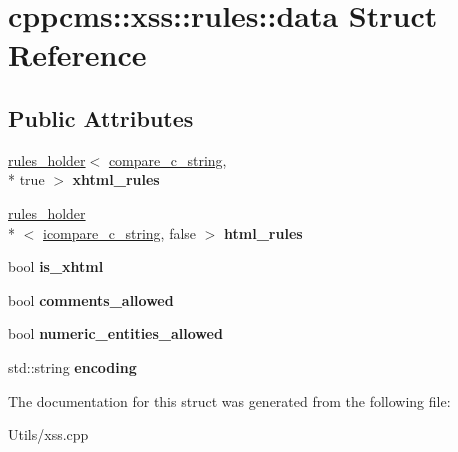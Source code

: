\hypertarget{structcppcms_1_1xss_1_1rules_1_1data}{\section{cppcms\-:\-:xss\-:\-:rules\-:\-:data Struct Reference}
\label{structcppcms_1_1xss_1_1rules_1_1data}
}
\subsection*{Public Attributes}
\begin{DoxyCompactItemize}
\item 
\hypertarget{structcppcms_1_1xss_1_1rules_1_1data_a983b8c626c300cebf64135dc3cc7a909}{\hyperlink{structcppcms_1_1xss_1_1rules__holder}{rules\-\_\-holder}$<$ \hyperlink{structcppcms_1_1xss_1_1compare__c__string}{compare\-\_\-c\-\_\-string}, \\*
true $>$ {\bfseries xhtml\-\_\-rules}}\label{structcppcms_1_1xss_1_1rules_1_1data_a983b8c626c300cebf64135dc3cc7a909}

\item 
\hypertarget{structcppcms_1_1xss_1_1rules_1_1data_ab79acdf873ec46e5362c7c79bc944a59}{\hyperlink{structcppcms_1_1xss_1_1rules__holder}{rules\-\_\-holder}\\*
$<$ \hyperlink{structcppcms_1_1xss_1_1icompare__c__string}{icompare\-\_\-c\-\_\-string}, false $>$ {\bfseries html\-\_\-rules}}\label{structcppcms_1_1xss_1_1rules_1_1data_ab79acdf873ec46e5362c7c79bc944a59}

\item 
\hypertarget{structcppcms_1_1xss_1_1rules_1_1data_af39843f9912c4b8eab116541649972d7}{bool {\bfseries is\-\_\-xhtml}}\label{structcppcms_1_1xss_1_1rules_1_1data_af39843f9912c4b8eab116541649972d7}

\item 
\hypertarget{structcppcms_1_1xss_1_1rules_1_1data_a059e2c781cb0e68116a0c1b984e8d539}{bool {\bfseries comments\-\_\-allowed}}\label{structcppcms_1_1xss_1_1rules_1_1data_a059e2c781cb0e68116a0c1b984e8d539}

\item 
\hypertarget{structcppcms_1_1xss_1_1rules_1_1data_a7837f14ef5ced69ebaf6349b904085e0}{bool {\bfseries numeric\-\_\-entities\-\_\-allowed}}\label{structcppcms_1_1xss_1_1rules_1_1data_a7837f14ef5ced69ebaf6349b904085e0}

\item 
\hypertarget{structcppcms_1_1xss_1_1rules_1_1data_acff8d3e95ed2cdcd4681c4b238ab3a80}{std\-::string {\bfseries encoding}}\label{structcppcms_1_1xss_1_1rules_1_1data_acff8d3e95ed2cdcd4681c4b238ab3a80}

\end{DoxyCompactItemize}


The documentation for this struct was generated from the following file\-:\begin{DoxyCompactItemize}
\item 
Utils/xss.\-cpp\end{DoxyCompactItemize}
